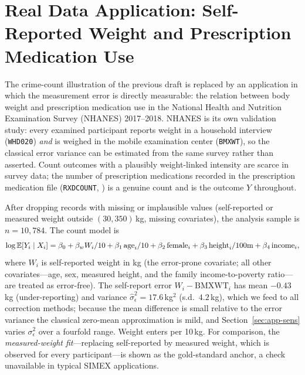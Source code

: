 
\section{Real Data Application: Self-Reported Weight and Prescription
Medication Use}\label{sec:app}

The crime-count illustration of the previous draft is replaced by an
application in which the measurement error is directly measurable: the
relation between body weight and prescription medication use in the
National Health and Nutrition Examination Survey (NHANES) 2017--2018.
NHANES is its own validation study: every examined participant reports
weight in a household interview (\texttt{WHD020}) \emph{and} is weighed
in the mobile examination center (\texttt{BMXWT}), so the classical
error variance can be estimated from the same survey rather than
asserted. Count outcomes with a plausibly weight-linked intensity are
scarce in survey data; the number of prescription medications recorded
in the prescription medication file (\texttt{RXDCOUNT},
\citep{nhanes-rxq}) is a genuine count and is the outcome
$Y$ throughout.

After dropping records with missing or implausible values (self-reported
or measured weight outside $(30,350)$\,kg, missing covariates), the
analysis sample is $n=10{,}784$. The count model is
\begin{equation}
  \log\mathbb{E}[Y_i\mid X_i] = \beta_0 + \beta_w W_i/10
    + \beta_1\,\mathrm{age}_i/10 + \beta_2\,\mathrm{female}_i
    + \beta_3\,\mathrm{height}_i/100\mathrm{m}
    + \beta_4\,\mathrm{income}_i,
  \label{eq:nhanes}
\end{equation}
where $W_i$ is self-reported weight in kg (the error-prone covariate;
all other covariates---age, sex, measured height, and the family
income-to-poverty ratio---are treated as error-free). The self-report
error $W_i-\mathrm{BMXWT}_i$ has mean $-0.43$\,kg (under-reporting) and
variance $\hat\sigma^2_\epsilon = 17.6$\,kg$^2$ (s.d.\ $4.2$\,kg),
which we feed to all correction methods; because the mean difference is
small relative to the error variance the classical zero-mean
approximation is mild, and Section~\ref{sec:app-sens} varies
$\sigma^2_\epsilon$ over a fourfold range. Weight enters per 10\,kg.
For comparison, the \emph{measured-weight fit}---replacing self-reported
by measured weight, which is observed for every participant---is shown
as the gold-standard anchor, a check unavailable in typical SIMEX
applications.

